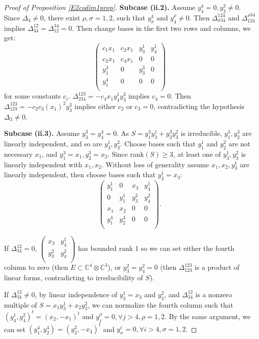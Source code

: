 \documentclass[10pt]{article} %
\theoremstyle{definition}
\begin{document}
\begin{proof}[Proof of Proposition \ref{E2codim1prop}]
\textbf{Subcase (ii.2).} Assume $y^4_4=0,y^3_3\neq0$. Since $\Delta_4\neq 0$, there exist $\rho,\sigma=1,2$, such that $y^4_{\sigma}$ and $y^{\rho}_4 \neq 0$. Then $\Delta^{124}_{\sigma 34}$ and $\Delta^{\rho 34}_{124}$ implies $\Delta^{12}_{34}=\Delta^{34}_{12}=0$. Then change bases in the first two rows and columns, we get:
$$\begin{pmatrix}
c_1x_1 & c_2 x_1 & y^1_3 & y^1_4 \\
c_3 x_1 & c_4 x_1 & 0 & 0 \\
y^3_1 & 0 & y^3_3 & 0 \\
y^4_1 & 0 & 0 &0 \\
\end{pmatrix}$$
for some constants $c_i$. $\Delta^{123}_{234}=-c_4x_1y^1_4y^3_3$ implies $c_4=0$. Then $\Delta^{123}_{123}=-c_2c_3(x_1)^2y^3_3$ implies either $c_2$ or $c_3=0$, contradicting the hypothesis $\Delta_3\neq 0$.

\textbf{Subcase (ii.3).} Assume $y^3_3=y^4_4=0$. As $S=y^3_1y^1_3+y^3_2y^2_3$ is irreducible, $y^3_1,y^3_2$ are linearly independent, and so are $y^1_3,y^2_3$. Choose bases such that $y^1_1$ and $y^2_2$ are not necessary $x_1$, and $y^3_1=x_1,y^3_2=x_2$. Since rank$(S)\geq 3$, at least one of $y^1_3,y^2_3$ is linearly independent with $x_1,x_2$. Without loss of generality assume $x_1,x_2,y^1_3$ are linearly independent, then choose bases such that $y^1_3=x_3$:
$$\begin{pmatrix}
y^1_1 & 0 & x_3 & y^1_4  \\
0 & y^1_1 & y^2_3 & y^2_4\\
x_1 & x_2 & 0   & 0 \\
y^4_1 & y^4_2 & 0   & 0\\
\end{pmatrix}.$$

If $\Delta^{12}_{34}=0$, 
$\begin{pmatrix}
 x_3 & y^1_4 \\
 y^2_3 & y^2_4\\
\end{pmatrix}$ has bounded rank 1 so we can set either the fourth column to zero (then $E\subset\mathbb{C}^4\otimes\mathbb{C}^3$), or $y^2_3=y^2_4=0$ (then $\Delta^{123}_{123}$ is a product of linear forms, contradicting to irreducibility of $S$). 

If $\Delta^{12}_{34}\neq0$, by linear independence of $y^1_3=x_3$ and $y^2_3$, and $\Delta^{12}_{34}$ is a nonzero multiple of $S=x_1y^1_3+x_2y^2_3$, we can normalize the fourth column such that $(y^1_4,y^2_4)^t=(x_2,-x_1)^t$ and $y^{\rho}_j=0,\forall j>4, \rho=1,2$. By the same argument, we can set $(y^4_1,y^4_2)=(y^2_3,-x_3)^t$ and $y^i_{\sigma}=0,\forall i>4, \sigma=1,2$.


\end{proof}
\end{document}
